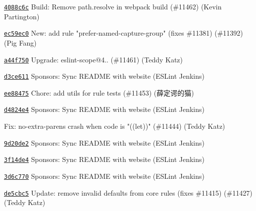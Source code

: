 \begin{DoxyItemize}
\item \href{https://github.com/eslint/eslint/commit/4088c6c9d4578cd581ce8ff4385d90b58a75b755}{\texttt{ {\ttfamily 4088c6c}}} Build\+: Remove path.\+resolve in webpack build (\#11462) (Kevin Partington)
\item \href{https://github.com/eslint/eslint/commit/ec59ec09c8d001b8c04f9edc09994e2b0d0af0f9}{\texttt{ {\ttfamily ec59ec0}}} New\+: add rule "{}prefer-\/named-\/capture-\/group"{} (fixes \#11381) (\#11392) (Pig Fang)
\item \href{https://github.com/eslint/eslint/commit/a44f75073306e5ea4e6722654009a99884fbca4f}{\texttt{ {\ttfamily a44f750}}} Upgrade\+: eslint-\/scope@4.. (\#11461) (Teddy Katz)
\item \href{https://github.com/eslint/eslint/commit/d3ce611e1c705440ccbcae357f2194134d026541}{\texttt{ {\ttfamily d3ce611}}} Sponsors\+: Sync README with website (ESLint Jenkins)
\item \href{https://github.com/eslint/eslint/commit/ee884754e4111e11994ff0df3f0c29e43e1dc3f2}{\texttt{ {\ttfamily ee88475}}} Chore\+: add utils for rule tests (\#11453) (薛定谔的猫)
\item \href{https://github.com/eslint/eslint/commit/d4824e46d7a6ca1618454d3c6198403382108123}{\texttt{ {\ttfamily d4824e4}}} Sponsors\+: Sync README with website (ESLint Jenkins)
\item \href{https://github.com/eslint/eslint/commit/64895185bde5233223648bcaf46f8deb72c9fb55}{\texttt{ {}}} Fix\+: no-\/extra-\/parens crash when code is "{}((let))"{} (\#11444) (Teddy Katz)
\item \href{https://github.com/eslint/eslint/commit/9d20de2b0ac756bd62888119b8e08c7441d8a5aa}{\texttt{ {\ttfamily 9d20de2}}} Sponsors\+: Sync README with website (ESLint Jenkins)
\item \href{https://github.com/eslint/eslint/commit/3f14de458ba120e9c013f5fc7c6fe3e9b40c1460}{\texttt{ {\ttfamily 3f14de4}}} Sponsors\+: Sync README with website (ESLint Jenkins)
\item \href{https://github.com/eslint/eslint/commit/3d6c7709d47e047b25d91ca1a77d6dab92313061}{\texttt{ {\ttfamily 3d6c770}}} Sponsors\+: Sync README with website (ESLint Jenkins)
\item \href{https://github.com/eslint/eslint/commit/de5cbc526b30405e742b35d85d04361529d49ed4}{\texttt{ {\ttfamily de5cbc5}}} Update\+: remove invalid defaults from core rules (fixes \#11415) (\#11427) (Teddy Katz)

\end{DoxyItemize}
